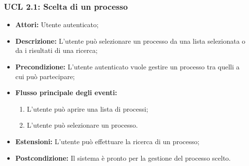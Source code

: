 \subsubsection{UCL 2.1: Scelta di un processo}
\begin{itemize}
\item \textbf{Attori:} Utente autenticato;
\item \textbf{Descrizione:} L'utente può selezionare un processo da una lista selezionata o da i risultati di una ricerca;
\item \textbf{Precondizione:} L'utente autenticato vuole gestire un processo tra quelli a cui può partecipare;
\item \textbf{Flusso principale degli eventi:}
\begin{enumerate}
\item L'utente può aprire una lista di processi;
\item L'utente può selezionare un processo.
\end{enumerate}
\item \textbf{Estensioni:} L'utente può effettuare la ricerca di un processo;
\item \textbf{Postcondizione:} Il sistema è pronto per la gestione del processo scelto.
\end{itemize}

\hypertarget{L2.1.1}{}
